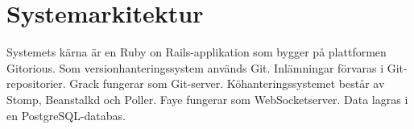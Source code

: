 \section{Systemarkitektur}
Systemets kärna är en Ruby on Rails-applikation som bygger på plattformen Gitorious. Som versionhanteringssystem används Git. Inlämningar förvaras i Git-repositorier. Grack fungerar som Git-server. Köhanteringssystemet består av Stomp, Beanstalkd och Poller. Faye fungerar som WebSocketserver. Data lagras i en PostgreSQL-databas.